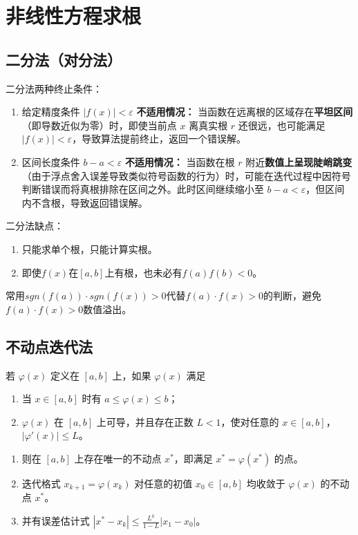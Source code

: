 \section{非线性方程求根}
\subsection{二分法（对分法）}
\mbox{}
二分法两种终止条件：
\begin{enumerate}
    \item  给定精度条件 \( |f(x)| < \varepsilon \)
    \textbf{不适用情况：}  
    当函数在远离根的区域存在\textbf{平坦区间}（即导数近似为零）时，即使当前点 \(x\) 离真实根 \(r\) 还很远，也可能满足 \( |f(x)| < \varepsilon \)，导致算法提前终止，返回一个错误解。
    
    \item 区间长度条件 \( b - a < \varepsilon \)
    \textbf{不适用情况：}  
    当函数在根 \( r \) 附近\textbf{数值上呈现陡峭跳变}（由于浮点舍入误差导致类似符号函数的行为）时，可能在迭代过程中因符号判断错误而将真根排除在区间之外。此时区间继续缩小至 \( b-a < \varepsilon \)，但区间内不含根，导致返回错误解。
\end{enumerate}

二分法缺点：
  \begin{enumerate}
    \item 只能求单个根，只能计算实根。
    \item 即使\(f(x)\text{在}[a,b]\text{上有根，也未必有}f(a)f(b)<0\)。
  \end{enumerate}  
\begin{note}
    常用\(sgn(f(a))\cdot sgn(f(x))> 0\text{代替}f(a)\cdot f(x)>0\)的判断，避免\(f(a)\cdot f(x)>0\)数值溢出。
\end{note}
\subsection{不动点迭代法}
\begin{theorem}
若 \(\varphi(x)\) 定义在 \([a, b]\) 上，如果 \(\varphi(x)\) 满足
\begin{enumerate}
    \item 当 \(x \in [a, b]\) 时有
    \(
    a \leq \varphi(x) \leq b
    \)；
    \item \(\varphi(x)\) 在 \([a, b]\) 上可导，并且存在正数 \(L < 1\)，使对任意的 \(x \in [a, b]\)，
    \(
    |\varphi'(x)| \leq L
    \)。
\end{enumerate}
\begin{enumerate}
    \item 则在 \([a, b]\) 上存在唯一的不动点 \(x^*\)，即满足 \(x^* = \varphi(x^*)\) 的点。
    \item 迭代格式 \(x_{k+1} = \varphi(x_k)\) 对任意的初值 \(x_0 \in [a, b]\) 均收敛于 \(\varphi(x)\) 的不动点 \(x^*\)。
    \item 并有误差估计式
\(\displaystyle
|x^* - x_k| \leq \frac{L^k}{1 - L} |x_1 - x_0|
\)。
\end{enumerate}
\end{theorem}

